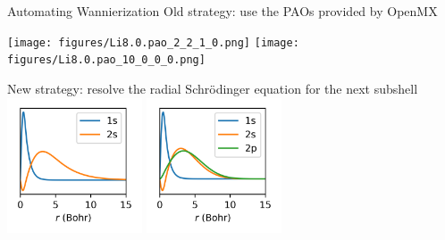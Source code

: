 \documentclass[xcolor=table,aspectratio=169]{beamer}
\numberwithin{equation}{section}
\begin{document}
\begin{frame}{Automating Wannierization}
   Old strategy: use the PAOs provided by OpenMX

   \texttt{[image: figures/Li8.0.pao\_2\_2\_1\_0.png]}
   \texttt{[image: figures/Li8.0.pao\_10\_0\_0\_0.png]}

   New strategy: resolve the radial Schrödinger equation for the next subshell
   \includegraphics[width=0.3\textwidth]{figures/plot_paos/old_projs.png}
   \includegraphics[width=0.3\textwidth]{figures/plot_paos/new_projs.png}

\end{frame}
\end{document}

